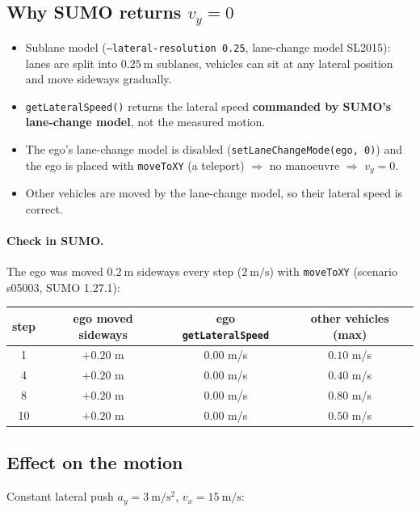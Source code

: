 \documentclass[11pt,a4paper]{article}
\begin{document}
\subsection{Why SUMO returns $v_y = 0$}
\begin{itemize}
  \item Sublane model (\texttt{--lateral-resolution 0.25}, lane-change model SL2015): lanes are split into
        $0.25~\mathrm{m}$ sublanes, vehicles can sit at any lateral position and move sideways gradually.
  \item \texttt{getLateralSpeed()} returns the lateral speed \textbf{commanded by SUMO's lane-change model},
        not the measured motion.
  \item The ego's lane-change model is disabled (\texttt{setLaneChangeMode(ego, 0)}) and the ego is placed with
        \texttt{moveToXY} (a teleport) $\Rightarrow$ no manoeuvre $\Rightarrow$ $v_y = 0$.
  \item Other vehicles are moved by the lane-change model, so their lateral speed is correct.
\end{itemize}

\paragraph{Check in SUMO.} The ego was moved $0.2~\mathrm{m}$ sideways every step ($2~\mathrm{m/s}$) with
\texttt{moveToXY} (scenario s05003, SUMO 1.27.1):

\begin{center}
\begin{tabular}{cccc}
  \toprule
  step & ego moved sideways & ego \texttt{getLateralSpeed} & other vehicles (max) \\
  \midrule
  1  & $+0.20$ m & $0.00$ m/s & $0.10$ m/s \\
  4  & $+0.20$ m & $0.00$ m/s & $0.40$ m/s \\
  8  & $+0.20$ m & $0.00$ m/s & $0.80$ m/s \\
  10 & $+0.20$ m & $0.00$ m/s & $0.50$ m/s \\
  \bottomrule
\end{tabular}
\end{center}

\subsection{Effect on the motion}
Constant lateral push $a_y = 3~\mathrm{m/s^2}$, $v_x = 15~\mathrm{m/s}$:
\end{document}
